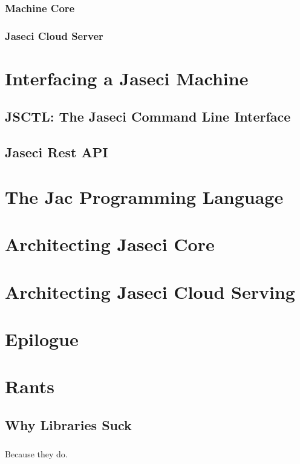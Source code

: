 \documentclass{book}
\begin{document}
\subsection{Machine Core}
\subsection{Jaseci Cloud Server}

\chapter{Interfacing a Jaseci Machine}
\section{JSCTL: The Jaseci Command Line Interface}
\section{Jaseci Rest API}

\chapter{The Jac Programming Language}


\chapter{Architecting Jaseci Core}


\chapter{Architecting Jaseci Cloud Serving}

\chapter*{Epilogue}

\appendix
\chapter{Rants}
\section{Why Libraries Suck}
\label{rant:librariessuck}
\paragraph{}
Because they do.
\end{document}
